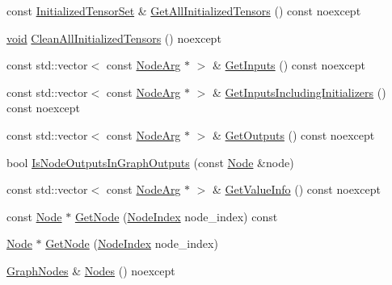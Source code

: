 \begin{DoxyCompactItemize}
\item 
const \mbox{\hyperlink{namespaceonnxruntime_a80c06ce917adca79f4a9c0f9ad3147f8}{Initialized\+Tensor\+Set}} \& \mbox{\hyperlink{classonnxruntime_1_1Graph_a1c73d249e30812794524d1791048d8f1}{Get\+All\+Initialized\+Tensors}} () const noexcept
\item 
\mbox{\hyperlink{mlasi_8h_a88f941d423cb2a819b70a1358982b1a6}{void}} \mbox{\hyperlink{classonnxruntime_1_1Graph_adf174d71ce23ccbf32f80b18ee1fa244}{Clean\+All\+Initialized\+Tensors}} () noexcept
\item 
const std\+::vector$<$ const \mbox{\hyperlink{classonnxruntime_1_1NodeArg}{Node\+Arg}} $\ast$ $>$ \& \mbox{\hyperlink{classonnxruntime_1_1Graph_a902f1039ac6666c1eb912694d73336d9}{Get\+Inputs}} () const noexcept
\item 
const std\+::vector$<$ const \mbox{\hyperlink{classonnxruntime_1_1NodeArg}{Node\+Arg}} $\ast$ $>$ \& \mbox{\hyperlink{classonnxruntime_1_1Graph_a8862e9a9d1e7f6ee12fab84e1763e125}{Get\+Inputs\+Including\+Initializers}} () const noexcept
\item 
const std\+::vector$<$ const \mbox{\hyperlink{classonnxruntime_1_1NodeArg}{Node\+Arg}} $\ast$ $>$ \& \mbox{\hyperlink{classonnxruntime_1_1Graph_a99c7d068aa441c8206c05539843586fa}{Get\+Outputs}} () const noexcept
\item 
bool \mbox{\hyperlink{classonnxruntime_1_1Graph_a6792107741a304a958ff78dc1fc137e0}{Is\+Node\+Outputs\+In\+Graph\+Outputs}} (const \mbox{\hyperlink{classonnxruntime_1_1Node}{Node}} \&node)
\item 
const std\+::vector$<$ const \mbox{\hyperlink{classonnxruntime_1_1NodeArg}{Node\+Arg}} $\ast$ $>$ \& \mbox{\hyperlink{classonnxruntime_1_1Graph_a3fe55ea6089b37f31c4f1446b9a8e6b1}{Get\+Value\+Info}} () const noexcept
\item 
const \mbox{\hyperlink{classonnxruntime_1_1Node}{Node}} $\ast$ \mbox{\hyperlink{classonnxruntime_1_1Graph_aec5e2348351170dc20d2c5a14b0a889c}{Get\+Node}} (\mbox{\hyperlink{namespaceonnxruntime_af8773b5c12b5d8fd9292eb2e268df760}{Node\+Index}} node\+\_\+index) const
\item 
\mbox{\hyperlink{classonnxruntime_1_1Node}{Node}} $\ast$ \mbox{\hyperlink{classonnxruntime_1_1Graph_a39d036c40a8ffd4fe06ecbb472b3cfb8}{Get\+Node}} (\mbox{\hyperlink{namespaceonnxruntime_af8773b5c12b5d8fd9292eb2e268df760}{Node\+Index}} node\+\_\+index)
\item 
\mbox{\hyperlink{classonnxruntime_1_1GraphNodes}{Graph\+Nodes}} \& \mbox{\hyperlink{classonnxruntime_1_1Graph_a0a4641ee31a7b5498ef7b9203208a98e}{Nodes}} () noexcept

\end{DoxyCompactItemize}
